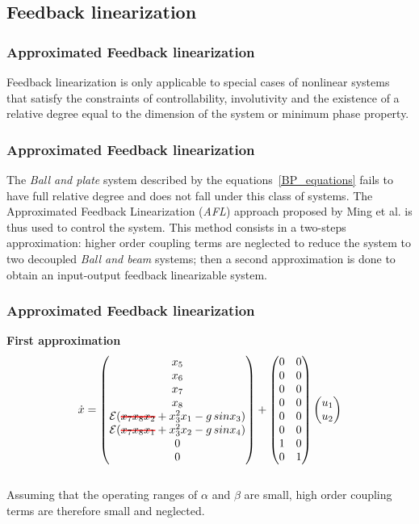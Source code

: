 \subsection{Feedback linearization}
\begin{frame}
\frametitle{Approximated Feedback linearization}
Feedback linearization is only applicable to special cases of nonlinear systems that satisfy the constraints of controllability, involutivity and the existence of a relative degree equal to the dimension of the system or minimum phase property.
\end{frame}
%
\begin{frame}
\frametitle{Approximated Feedback linearization}
The \textit{Ball and plate} system described by the equations~\ref{BP_equations} fails to have full relative degree and does not fall under this class of systems. The Approximated Feedback Linearization (\textit{AFL}) approach proposed by Ming et al. is thus used to control the system. This method consists in a two-steps approximation: higher order coupling terms are neglected to reduce the system to two decoupled \textit{Ball and beam} systems; then a second approximation is done to obtain an input-output feedback linearizable system.
\end{frame}
%
\begin{frame}
\frametitle{Approximated Feedback linearization}
\textbf{First approximation}
\begin{equation}\label{eq:simplified_dynamic}
\dot{x} =%
	\begin{pmatrix}
	x_5\\
	x_6\\
	x_7\\
	x_8\\
	\mathcal{E}(\hcancel[red]{x_7x_8x_2} + x^2_3x_1 - g\,sinx_3)\\
	\mathcal{E}(\hcancel[red]{x_7x_8x_1} + x^2_3x_2 - g\,sinx_4)\\
	0\\
	0\\
	\end{pmatrix}
	+
	\begin{pmatrix}
		0 &0\\
		0 &0\\
		0 &0\\
		0 &0\\
		0 &0\\
		0 &0\\
		1 &0\\
		0 &1\\
	\end{pmatrix}
	\begin{pmatrix}
		u_1\\
	 	u_2
	\end{pmatrix}
\end{equation}\\[10pt]
Assuming that the operating ranges of $\alpha$ and $\beta$ are small, high order coupling terms are therefore small and neglected.
\end{frame}
